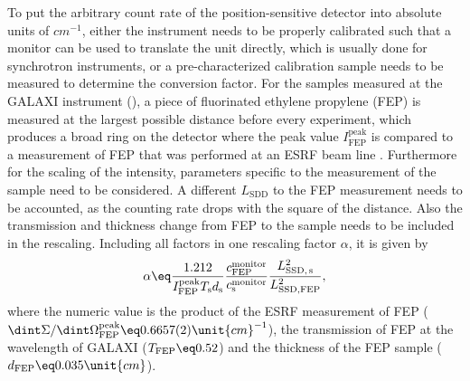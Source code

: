 \documentclass[\main/dresen_thesis.tex]{subfiles}
\begin{document}
    To put the arbitrary count rate of the position-sensitive detector into absolute units of $\unit{cm^{-1}}$, either the instrument needs to be properly calibrated such that a monitor can be used to translate the unit directly, which is usually done for synchrotron instruments, or a pre-characterized calibration sample needs to be measured to determine the conversion factor.
    For the samples measured at the GALAXI instrument (), a piece of fluorinated ethylene propylene (FEP) is measured at the largest possible distance before every experiment, which produces a broad ring on the detector where the peak value $I_\mathrm{FEP}^\mathrm{peak}$ is compared to a measurement of FEP that was performed at an ESRF beam line \cite{Meyer_2009_Struk}.
    Furthermore for the scaling of the intensity, parameters specific to the measurement of the sample need to be considered.
    A different $L_\mathrm{SDD}$ to the FEP measurement needs to be accounted, as the counting rate drops with the square of the distance.
    Also the transmission and thickness change from FEP to the sample needs to be included in the rescaling.
    Including all factors in one rescaling factor $\alpha$, it is given by
    \begin{align}
      \alpha \eq \frac{1.212}{I_\mathrm{FEP}^\mathrm{peak} T_\mathrm{s} d_\mathrm{s}} \frac{c^\mathrm{monitor}_\mathrm{FEP}}{c_\mathrm{s}^\mathrm{monitor}} \frac{L^2_\mathrm{SSD,\, s}}{L^2_\mathrm{SSD, FEP}},
    \end{align}
    where the numeric value is the product of the ESRF measurement of FEP ($\dint \Sigma / \dint \Omega_\mathrm{FEP}^\mathrm{peak} \eq 0.6657(2) \unit{cm}^{-1}$), the transmission of FEP at the wavelength of GALAXI ($T_\mathrm{FEP} \eq 0.52$) and the thickness of the FEP sample ($d_\mathrm{FEP} \eq 0.035 \unit{cm}$).
\end{document}
